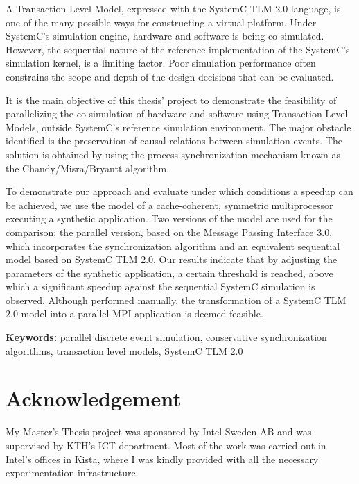 \documentclass[11pt]{article}
\begin{document}
A Transaction Level Model, expressed with the SystemC TLM 2.0 language, is one of the many possible ways for constructing a virtual platform.
Under SystemC's simulation engine, hardware and software is being co-simulated.
However, the sequential nature of the reference implementation of the SystemC's simulation kernel, is a limiting factor.
Poor simulation performance often constrains the scope and depth of the design decisions that can be evaluated.

It is the main objective of this thesis' project to demonstrate the feasibility of parallelizing the co-simulation of hardware and software using Transaction Level Models, outside SystemC's reference simulation environment.
The major obstacle identified is the preservation of causal relations between simulation events.
The solution is obtained by using the process synchronization mechanism known as the Chandy/Misra/Bryantt algorithm.

To demonstrate our approach and evaluate under which conditions a speedup can be achieved, we use the model of a cache-coherent, symmetric multiprocessor executing a synthetic application. 
Two versions of the model are used for the comparison; the parallel version, based on the Message Passing Interface 3.0, which incorporates the synchronization algorithm and an equivalent sequential model based on SystemC TLM 2.0.
Our results indicate that by adjusting the parameters of the synthetic application, a certain threshold is reached, above which a significant speedup against the sequential SystemC simulation is observed.
Although performed manually, the transformation of a SystemC TLM 2.0 model into a parallel MPI application is deemed feasible.

\textbf{Keywords:} parallel discrete event simulation, conservative synchronization algorithms, transaction level models, SystemC TLM 2.0



\clearpage

\section*{Acknowledgement}
\label{sec:org2c414cb}
\pagestyle{empty}

My Master's Thesis project was sponsored by Intel Sweden AB and was supervised by KTH's ICT department.
Most of the work was carried out in Intel's offices in Kista, where I was kindly provided with all the necessary experimentation infrastructure.\\
\end{document}
